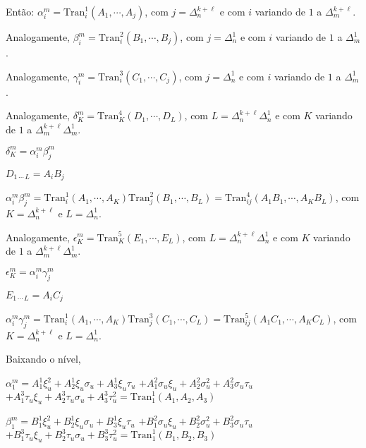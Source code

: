 \documentclass[12pt]{article}
\begin{document}
		Ent\~ao: $\alpha_i^m = \text{Tran}_i^1(A_1, \cdots, A_j)$, com $j = \Delta_n^{k + \ell}$ e com $i$ variando de $1$ a $\Delta_m^{k + \ell}$.

		\vspace{3mm}

		Analogamente, $\beta_i^m = \text{Tran}_i^2(B_1, \cdots, B_j)$, com $j = \Delta_n^1$ e com $i$ variando de $1$ a $\Delta_m^1$.

		\vspace{3mm}

		Analogamente, $\gamma_i^m = \text{Tran}_i^3(C_1, \cdots, C_j)$, com $j = \Delta_n^1$ e com $i$ variando de $1$ a $\Delta_m^1$.

		\vspace{3mm}

		Analogamente, $\delta_K^m = \text{Tran}_K^4(D_1, \cdots, D_L)$, com $L = \Delta_n^{k + \ell} \Delta_n^1$ e com $K$ variando de $1$ a $\Delta_m^{k + \ell} \Delta_m^1$.

		$\delta_K^m = \alpha_i^m \beta_j^m$

		$D_{1\,\cdots\,L} = A_i B_j$

		$\alpha_i^m \beta_j^m = \text{Tran}_i^1(A_1, \cdots, A_K) \text{Tran}_j^2(B_1, \cdots, B_L) = \text{Tran}_{ij}^4(A_1 B_1, \cdots, A_K B_L)$, com $K = \Delta_n^{k + \ell}$ e $L = \Delta_n^1$.

		\vspace{3mm}

		Analogamente, $\epsilon_K^m = \text{Tran}_K^5(E_1, \cdots, E_L)$, com $L = \Delta_n^{k + \ell} \Delta_n^1$ e com $K$ variando de $1$ a $\Delta_m^{k + \ell} \Delta_m^1$.

		$\epsilon_K^m = \alpha_i^m \gamma_j^m$

		$E_{1\,\cdots\,L} = A_i C_j$

		$\alpha_i^m \gamma_j^m = \text{Tran}_i^1(A_1, \cdots, A_K) \text{Tran}_j^3(C_1, \cdots, C_L) = \text{Tran}_{ij}^5(A_1 C_1, \cdots, A_K C_L)$, com $K = \Delta_n^{k + \ell}$ e $L = \Delta_n^1$.

		\vspace{3mm}

		Baixando o n\'ivel,

		$\alpha_1^m = A_1^1 \xi_u^2  + A_2^1 \xi_u \sigma_u  + A_3^1 \xi_u \tau_u$
		$+ A_1^2 \sigma_u \xi_u  + A_2^2 \sigma_u^2  + A_3^2 \sigma_u \tau_u$
		$+ A_1^3 \tau_u \xi_u  + A_2^3 \tau_u \sigma_u  + A_3^3 \tau_u^2 = \text{Tran}_1^1(A_1,A_2,A_3)$

		$\beta_1^m = B_1^1 \xi_u^2  + B_2^1 \xi_u \sigma_u  + B_3^1 \xi_u \tau_u$
		$+ B_1^2 \sigma_u \xi_u  + B_2^2 \sigma_u^2  + B_3^2 \sigma_u \tau_u$
		$+ B_1^3 \tau_u \xi_u  + B_2^3 \tau_u \sigma_u  + B_3^3 \tau_u^2 = \text{Tran}_1^1(B_1,B_2,B_3)$
\end{document}

